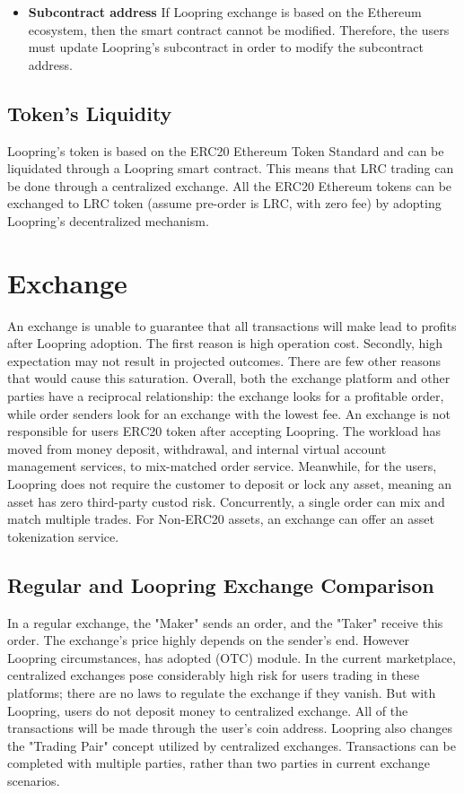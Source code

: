 \documentclass[UTF8,nofonts]{article}
\begin{document}
\begin{itemize}
   \item \textbf{Subcontract address} If Loopring exchange is based on the Ethereum ecosystem, then the smart contract cannot be modified. Therefore, the users must update Loopring's subcontract in order to modify the subcontract address.
 \end{itemize}


\subsection{Token's Liquidity}

Loopring's token is based on the ERC20 Ethereum Token Standard and can be liquidated through a Loopring smart contract. This means that LRC trading can be done through a centralized exchange. All the ERC20 Ethereum tokens can be exchanged to LRC token (assume pre-order is LRC, with zero fee) by adopting Loopring's decentralized mechanism.


\section{Exchange\label{sec: exchange}}

An exchange is unable to guarantee that all transactions will make lead to profits after Loopring adoption. The first reason is high operation cost. Secondly, high expectation may not result in projected outcomes. There are few other reasons that would cause this saturation. Overall,  both the exchange platform and other parties have a reciprocal relationship: the exchange looks for a profitable order, while order senders look for an exchange with the lowest fee.
An exchange is not responsible for users ERC20 token after accepting Loopring. The workload has moved from money deposit, withdrawal,  and internal virtual account management services, to mix-matched order service. Meanwhile, for the users, Loopring does not require the customer to deposit or lock any asset, meaning an asset has zero third-party custod risk. Concurrently, a single order can mix and match multiple trades. For Non-ERC20 assets, an exchange can offer an asset tokenization service.

\subsection{Regular and Loopring Exchange Comparison}
In a regular exchange, the "Maker" sends an order, and the "Taker" receive this order. The exchange's price highly depends on the sender's end. However Loopring circumstances, has adopted (OTC) module.
In the current marketplace, centralized exchanges pose considerably high risk for users trading in these platforms; there are no laws to regulate the exchange if they vanish. But with Loopring, users do not deposit money to centralized exchange. All of the transactions will be made through the user's coin address.
Loopring also changes the "Trading Pair" concept utilized by centralized exchanges. Transactions can be completed with multiple parties, rather than two parties in current exchange scenarios.
\end{document}
